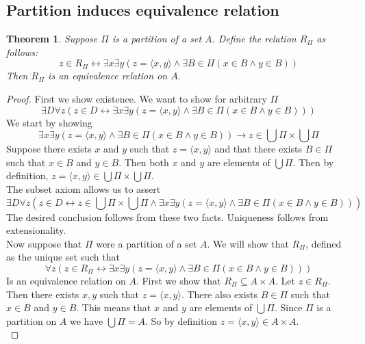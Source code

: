 \documentclass{report}
\newtheorem{theorem}[theo]{Theorem}
\begin{document}
\subsection{Partition induces equivalence relation}
\begin{theorem}
Suppose $\Pi$ is a partition of a set $A$. Define the relation $R_\Pi$ as follows:
\begin{equation*}
z\in R_\Pi\leftrightarrow\exists x\exists y(z=\langle x,y\rangle\land\exists B\in\Pi(x\in B\land y\in B))
\end{equation*}
Then $R_\Pi$ is an equivalence relation on $A$.
\end{theorem}
\begin{proof} First we show existence.
We want to show for arbitrary $\Pi$
\begin{equation*}
\exists D\forall z(z\in D\leftrightarrow\exists x\exists y(z=\langle x,y\rangle\land\exists B\in\Pi(x\in B\land y\in B)))
\end{equation*}
We start by showing
\begin{equation*}
\exists x\exists y(z=\langle x,y\rangle\land\exists B\in\Pi(x\in B\land y\in B))\to z\in\bigcup\Pi\times\bigcup\Pi
\end{equation*}
Suppose there exists $x$ and $y$ such that $z=\langle x,y\rangle$ and that there exists $B\in\Pi$ such that $x\in B$ and $y\in B$. Then both $x$ and $y$ are elements of $\bigcup\Pi$.
Then by definition, $z=\langle x,y\rangle\in\bigcup\Pi\times\bigcup\Pi$.\\
\indent The subset axiom allows us to assert
\begin{equation*}
\exists D\forall z(z\in D\leftrightarrow z\in\bigcup\Pi\times\bigcup\Pi\land\exists x\exists y(z=\langle x,y\rangle\land\exists B\in\Pi(x\in B\land y\in B)))
\end{equation*}
The desired conclusion follows from these two facts. Uniqueness follows from extensionality.\\
\indent Now suppose that $\Pi$ were a partition of a set $A$. We will show that $R_\Pi$, defined as
the unique set such that 
\begin{equation*}
\forall z(z\in R_\Pi\leftrightarrow\exists x\exists y(z=\langle x,y\rangle\land\exists B\in\Pi(x\in B\land y\in B)))
\end{equation*}
Is an equivalence relation on $A$. First we show that $R_\Pi\subseteq A\times A$. Let $z\in R_\Pi$.
Then there exists $x,y$ such that $z=\langle x,y\rangle$. There also exists $B\in\Pi$ such that $x\in B$
and $y\in B$. This means that $x$ and $y$ are elements of $\bigcup\Pi$. Since $\Pi$ is a partition on $A$ we have $\bigcup\Pi=A$. So by definition $z=\langle x,y\rangle\in A\times A$.\\

\end{proof}
\end{document}
